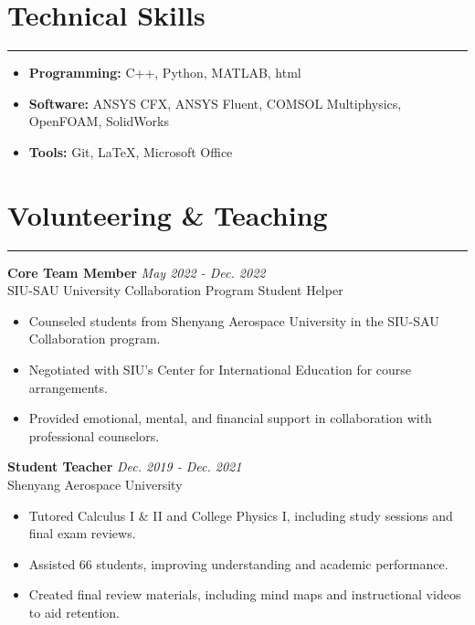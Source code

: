 \documentclass[11pt]{article}
\begin{document}

\section*{Technical Skills}
\hrule
\begin{itemize}[leftmargin=*,itemsep=1pt]
    \item \textbf{Programming:} C++, Python, MATLAB, html
    \item \textbf{Software:} ANSYS CFX, ANSYS Fluent, COMSOL Multiphysics, OpenFOAM, SolidWorks
    \item \textbf{Tools:} Git, LaTeX, Microsoft Office
\end{itemize}

\vspace{2mm}

\section*{Volunteering \& Teaching}
\hrule

\noindent\textbf{Core Team Member} \hfill \textit{May 2022 - Dec. 2022} \\
SIU-SAU University Collaboration Program Student Helper
\begin{itemize}[leftmargin=*,itemsep=1pt]
    \item Counseled students from Shenyang Aerospace University in the SIU-SAU Collaboration program.
    \item Negotiated with SIU's Center for International Education for course arrangements.
    \item Provided emotional, mental, and financial support in collaboration with professional counselors.
\end{itemize}

\vspace{2mm}

\noindent \textbf{Student Teacher} \hfill \textit{Dec. 2019 - Dec. 2021} \\
Shenyang Aerospace University
\begin{itemize}[leftmargin=*,itemsep=1pt] 
    \item Tutored Calculus I \& II and College Physics I, including study sessions and final exam reviews.
    \item Assisted 66 students, improving understanding and academic performance.
    \item Created final review materials, including mind maps and instructional videos to aid retention.
\end{itemize}
\end{document}
